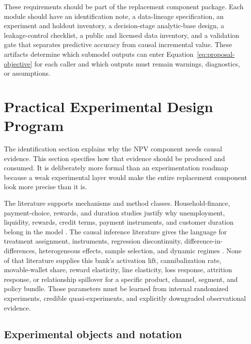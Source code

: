 \documentclass[11pt]{article}
\newcommand{\1}{\mathbf{1}}
\begin{document}
These requirements should be part of the replacement component package. Each
module should have an identification note, a data-lineage specification, an
experiment and holdout inventory, a decision-stage analytic-base design, a
leakage-control checklist, a public and licensed data inventory, and a
validation gate that separates predictive accuracy from causal incremental
value. These artifacts determine which submodel outputs can enter
Equation~\eqref{eq:proposal-objective} for each caller and which outputs must
remain warnings, diagnostics, or assumptions.

\section{Practical Experimental Design Program}
\label{sec:experimental-design-program}

The identification section explains why the NPV component needs causal
evidence. This section specifies how that evidence should be produced and
consumed. It is deliberately more formal than an experimentation roadmap
because a weak experimental layer would make the entire replacement component
look more precise than it is.

The literature supports mechanisms and method classes. Household-finance,
payment-choice, rewards, and duration studies justify why unemployment,
liquidity, rewards, credit terms, payment instruments, and customer duration
belong in the model
\citep{gross2001liquidity,koulayev2012payment,agarwal2010rewards,
prelec2001creditcard,ganong2019unemployment,johnson2004rebates,
schmittlein1987counting,fader2005bgnbd,bolton1998duration}. The causal
inference literature gives the language for treatment assignment, instruments,
regression discontinuity, difference-in-differences, heterogeneous effects,
sample selection, and dynamic regimes
\citep{rosenbaum1983propensity,imbensrubin2015causal,
angristimbensrubin1996iv,lee2010rd,callaway2021did,sun2021eventstudy,
wager2018causalforests,chernozhukov2018dml,heckman1979selection,
murphy2003dynamic,puterman1994mdp}. None of that literature supplies this
bank's activation lift, cannibalization rate, movable-wallet share, reward
elasticity, line elasticity, loss response, attrition response, or relationship
spillover for a specific product, channel, segment, and policy bundle. Those
parameters must be learned from internal randomized experiments, credible
quasi-experiments, and explicitly downgraded observational evidence.

\subsection{Experimental objects and notation}
\end{document}
